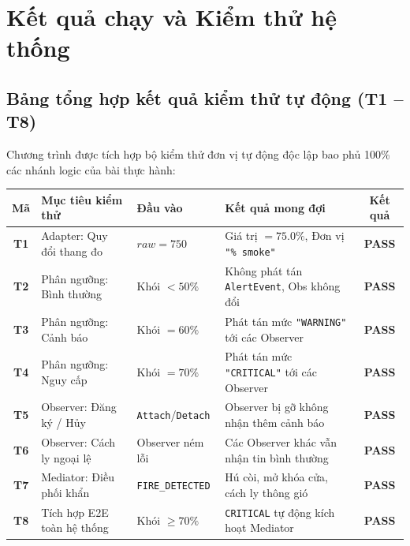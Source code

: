 \documentclass[11pt,a4paper]{article}
\begin{document}
\newpage

\section{Kết quả chạy và Kiểm thử hệ thống}

\subsection{Bảng tổng hợp kết quả kiểm thử tự động (T1 -- T8)}
Chương trình được tích hợp bộ kiểm thử đơn vị tự động độc lập bao phủ 100\% các nhánh logic của bài thực hành:

\begin{table}[H]
\centering
\footnotesize
\renewcommand{\arraystretch}{1.18}
\begin{tabular}{cp{3.8cm}p{2.8cm}p{6.8cm}c}
\toprule
\textbf{Mã} & \textbf{Mục tiêu kiểm thử} & \textbf{Đầu vào} & \textbf{Kết quả mong đợi} & \textbf{Kết quả} \\
\midrule
\textbf{T1} & Adapter: Quy đổi thang đo & $raw = 750$ & Giá trị $= 75.0\%$, Đơn vị \texttt{"\% smoke"} & \textbf{\textcolor{green!60!black}{PASS}} \\
\textbf{T2} & Phân ngưỡng: Bình thường & Khói $< 50\%$ & Không phát tán \texttt{AlertEvent}, Obs không đổi & \textbf{\textcolor{green!60!black}{PASS}} \\
\textbf{T3} & Phân ngưỡng: Cảnh báo & Khói $= 60\%$ & Phát tán mức \texttt{"WARNING"} tới các Observer & \textbf{\textcolor{green!60!black}{PASS}} \\
\textbf{T4} & Phân ngưỡng: Nguy cấp & Khói $= 70\%$ & Phát tán mức \texttt{"CRITICAL"} tới các Observer & \textbf{\textcolor{green!60!black}{PASS}} \\
\textbf{T5} & Observer: Đăng ký / Hủy & \texttt{Attach}/\texttt{Detach} & Observer bị gỡ không nhận thêm cảnh báo & \textbf{\textcolor{green!60!black}{PASS}} \\
\textbf{T6} & Observer: Cách ly ngoại lệ & Observer ném lỗi & Các Observer khác vẫn nhận tin bình thường & \textbf{\textcolor{green!60!black}{PASS}} \\
\textbf{T7} & Mediator: Điều phối khẩn & \texttt{FIRE\_DETECTED} & Hú còi, mở khóa cửa, cách ly thông gió & \textbf{\textcolor{green!60!black}{PASS}} \\
\textbf{T8} & Tích hợp E2E toàn hệ thống & Khói $\ge 70\%$ & \texttt{CRITICAL} tự động kích hoạt Mediator & \textbf{\textcolor{green!60!black}{PASS}} \\
\bottomrule
\end{tabular}
\end{table}
\end{document}
